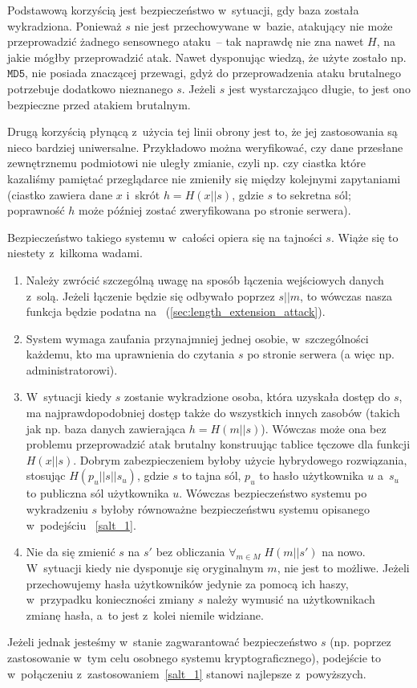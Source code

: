 Podstawową korzyścią jest bezpieczeństwo w~sytuacji, gdy baza została
wykradziona. Ponieważ $s$ nie jest przechowywane w~bazie, atakujący nie może
przeprowadzić żadnego sensownego ataku~-- tak naprawdę nie zna nawet $H$, na
jakie mógłby przeprowadzić atak. Nawet dysponując wiedzą, że użyte zostało np.
$\texttt{MD5}$, nie posiada znaczącej przewagi, gdyż do przeprowadzenia ataku
brutalnego potrzebuje dodatkowo nieznanego $s$. Jeżeli $s$ jest wystarczająco
długie, to jest ono bezpieczne przed atakiem brutalnym.

Drugą korzyścią płynącą z~użycia tej linii obrony jest to, że jej zastosowania
są nieco bardziej uniwersalne. Przykładowo można weryfikować, czy dane
przesłane zewnętrznemu podmiotowi nie uległy zmianie, czyli np. czy ciastka
które kazaliśmy pamiętać przeglądarce nie zmieniły się między kolejnymi
zapytaniami (ciastko zawiera dane $x$ i~skrót $h = H(x||s)$, gdzie $s$ to
sekretna sól; poprawność $h$ może później zostać zweryfikowana po stronie
serwera).

Bezpieczeństwo takiego systemu w~całości opiera się na tajności $s$. Wiąże się
to niestety z~kilkoma wadami.
\begin{enumerate}

\item Należy zwrócić szczególną uwagę na sposób łączenia wejściowych danych
z~solą. Jeżeli łączenie będzie się odbywało poprzez $s||m$, to wówczas nasza
funkcja będzie podatna na ~(\ref{sec:length_extension_attack}).

\item System wymaga zaufania przynajmniej jednej osobie, w~szczególności
każdemu, kto ma uprawnienia do czytania $s$ po stronie serwera (a więc np.
administratorowi).

\item W~sytuacji kiedy $s$ zostanie wykradzione osoba, która uzyskała dostęp do
$s$, ma najprawdopodobniej dostęp także do wszystkich innych zasobów (takich
jak np. baza danych zawierająca $h=H(m||s)$). Wówczas może ona bez problemu
przeprowadzić atak brutalny konstruując tablice tęczowe dla funkcji $H(x||s)$.
Dobrym zabezpieczeniem byłoby użycie hybrydowego rozwiązania, stosując
$H(p_u||s||s_u)$, gdzie $s$ to tajna sól, $p_u$ to hasło użytkownika $u$
a~$s_u$ to publiczna sól użytkownika $u$. Wówczas bezpieczeństwo systemu po
wykradzeniu $s$ byłoby równoważne bezpieczeństwu systemu opisanego w~podejściu
~\ref{salt_1}.

\item Nie da się zmienić $s$ na $s'$ bez obliczania $\forall_{m \in M} \;
H(m||s')$ na nowo. W~sytuacji kiedy nie dysponuje się oryginalnym $m$, nie jest
to możliwe. Jeżeli przechowujemy hasła użytkowników jedynie za pomocą ich
haszy, w~przypadku konieczności zmiany $s$ należy wymusić na użytkownikach
zmianę hasła, a~to jest z~kolei niemile widziane.

\end{enumerate}
Jeżeli jednak jesteśmy w~stanie zagwarantować bezpieczeństwo $s$ (np. poprzez
zastosowanie w~tym celu osobnego systemu kryptograficznego), podejście to
w~połączeniu z~zastosowaniem~\ref{salt_1} stanowi najlepsze z~powyższych.

